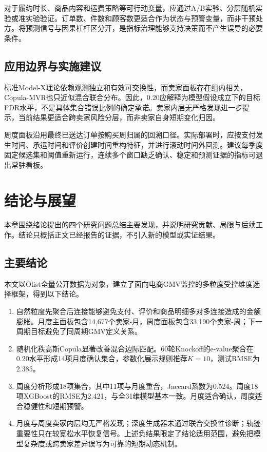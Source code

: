 \documentclass{sufethesismas}
\providecommand{\tightlist}{\setlength{\itemsep}{0pt}\setlength{\parskip}{0pt}}
\begin{document}
对于履约时长、商品内容和运费策略等可行动变量，应通过A/B实验、分层随机实验或准实验验证。订单数、件数和顾客数更适合作为状态与预警变量，而非干预处方。将预测信号与因果杠杆区分开，是指标治理能够支持决策而不产生误导的必要条件。

\section{应用边界与实施建议}

标准Model-X理论依赖观测独立和有效可交换性，而卖家面板存在组内相关，Copula-MVR也只近似混合联合分布。因此，0.20应解释为模型假设成立下的目标FDR水平，不是具体集合错误比例的确定承诺。卖家内层无严格发现进一步提示，当前结果更适合跨卖家风险分层，而非卖家自身短期变化归因。

周度面板沿用最终已送达订单按购买周归属的回溯口径。实际部署时，应按支付发生时间、承运时间和评价创建时间重构特征，并进行滚动时间外回测。建议每季度固定候选集和阈值重新运行，连续多个窗口缺乏确认、稳定和预测证据的指标可退出常驻看板。

\chapter{结论与展望}

本章围绕绪论提出的四个研究问题总结主要发现，并说明研究贡献、局限与后续工作。结论只概括正文已经报告的证据，不引入新的模型或实证结果。

\section{主要结论}

本文以Olist全量公开数据为对象，建立了面向电商GMV监控的多粒度受控维度选择框架，得到以下结论。

\begin{enumerate}
\def\labelenumi{\arabic{enumi}.}
\tightlist
\item
  自然粒度先聚合后连接能够避免支付、评价和商品明细多对多连接造成的金额膨胀。月度主面板包含14,677个卖家-月，周度面板包含33,190个卖家-周；下一周期目标避免了同周期GMV定义关系。
\item
  随机化秩高斯Copula显著改善混合边际匹配。60轮Knockoff的e-value聚合在0.20水平形成14项月度确认集合，参数化展示规则推荐\(K=10\)，测试RMSE为2.385。
\item
  周度分析形成18项集合，其中11项与月度重合，Jaccard系数为0.524。周度18项XGBoost的RMSE为2.421，与全31维模型基本一致。月度适合确认，周度适合稳健性和短期预警。
\item
  月度与周度卖家内层均无严格发现；深度生成器未通过联合交换性诊断；轨迹重要性只在较宽松水平恢复信号。上述负结果限定了结论适用范围，避免把模型复杂度或跨卖家差异误写为可靠的短期动态机制。
\end{enumerate}
\end{document}
